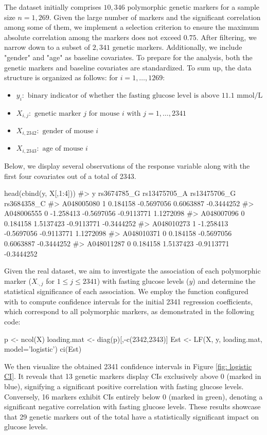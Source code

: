 The dataset initially comprises $10,346$ polymorphic genetic markers for a sample size $n=1,269$. Given the large number of markers and the significant correlation among some of them, we implement a selection criterion to ensure the maximum absolute correlation among the markers does not exceed $0.75$. After filtering, we narrow down to a subset of $2, 341$ genetic markers. Additionally, we include "gender" and "age" as baseline covariates. To prepare for the analysis, both the genetic markers and baseline covariates are standardized.
To sum up, the data structure is organized as follows: for $i = 1,\ldots,1269$:
\begin{itemize}
    \item $y_i: \textrm{ binary indicator of whether the fasting glucose level is above $11.1$ mmol/L}$
    \item $X_{i,j}: \textrm{ genetic marker $j$ for mouse $i$ with $j=1,\ldots,2341$}$
    \item $X_{i, 2342}: \textrm{ gender of mouse $i$}$
    \item $X_{i,2343}: \textrm{ age of mouse $i$}$
\end{itemize}
\noindent Below, we display several observations of the response variable along with the first four covariates out of a total of 2343.
\newpage
\begin{example}
    head(cbind(y, X[,1:4]))
    #>              y rs3674785_G rs13475705_A rs13475706_G rs3684358_C
    #>   A048005080 1    0.184158   -0.5697056    0.6063887  -0.3444252
    #>   A048006555 0   -1.258413   -0.5697056   -0.9113771   1.1272098
    #>   A048007096 0    0.184158    1.5137423   -0.9113771  -0.3444252
    #>   A048010273 1   -1.258413   -0.5697056   -0.9113771   1.1272098
    #>   A048010371 0    0.184158   -0.5697056    0.6063887  -0.3444252
    #>   A048011287 0    0.184158    1.5137423   -0.9113771  -0.3444252
\end{example}


\noindent Given the real dataset, we aim to investigate the association of each polymorphic marker ($X_{\cdot, j}$ for $1\leq j\leq 2341$) with fasting glucose levels ($y$) and determine the statistical significance of each association. We employ the function  configured with  to compute confidence intervals for the initial 2341 regression coefficients, which correspond to all polymorphic markers, as demonstrated in the following code:
\begin{example}
    p <- ncol(X)
    loading.mat <- diag(p)[,-c(2342,2343)]
    Est <- LF(X, y, loading.mat, model='logistic')
    ci(Est)
\end{example}
We then visualize the obtained 2341 confidence intervals in Figure \ref{fig: logistic CI}.
It reveals that 13 genetic markers display CIs exclusively above $0$ (marked in {\color{NeonBlue}blue}), signifying a significant positive correlation with fasting glucose levels. Conversely, 16 markers exhibit CIs entirely below $0$ (marked in {\color{NeonGreen} green}), denoting a significant negative correlation with fasting glucose levels. These results showcase that 29 genetic markers out of the total have a statistically significant impact on glucose levels.

